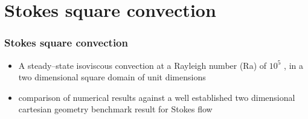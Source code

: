\section{Stokes square convection}

\begin{frame}
    \frametitle{Stokes square convection}
\begin{itemize}
\item A steady–state isoviscous convection at a Rayleigh number (Ra) of $10^5$ , in a
  two dimensional square domain of unit dimensions 
\item comparison of numerical results against a well established two dimensional cartesian geometry
  benchmark result for Stokes flow
\end{itemize}
\end{frame}

